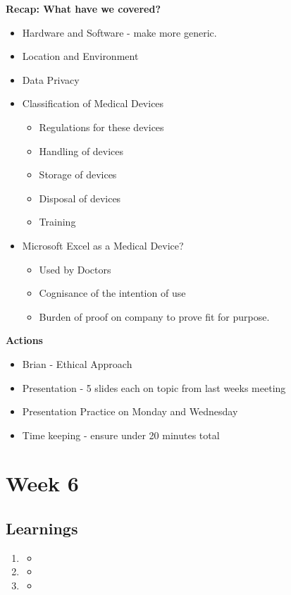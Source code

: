 \textbf{Recap: What have we covered?}
\begin{itemize}
\item Hardware and Software - make more generic.
\item Location and Environment
\item Data Privacy
\item Classification of Medical Devices
\begin{itemize}
\item Regulations for these devices
\item Handling of devices
\item Storage of devices
\item Disposal of devices
\item Training
\end{itemize}
\item Microsoft Excel as a Medical Device?
\begin{itemize}
\item Used by Doctors
\item Cognisance of the intention of use
\item Burden of proof on company to prove fit for purpose.
\end{itemize}
\end{itemize}

\textbf{Actions}
\begin{itemize}
\item Brian - Ethical Approach
\item Presentation - 5 slides each on topic from last weeks meeting
\item Presentation Practice on Monday and Wednesday
\item Time keeping - ensure under 20 minutes total
\end{itemize}


\chapter{Week 6}

\section{Learnings}
\begin{enumerate}
\item
\begin{itemize}
\item
\end{itemize}
\item
\begin{itemize}
\item
\end{itemize}
\item
\begin{itemize}
\item
\end{itemize}
\end{enumerate}

